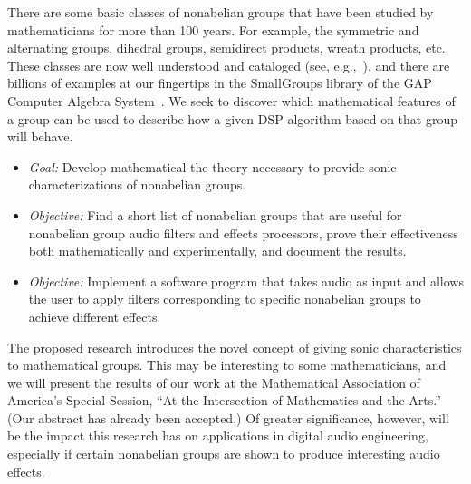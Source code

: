 \documentclass[10pt]{article}
\begin{document}
There are some basic classes of nonabelian groups that have been studied by
mathematicians for more than 100 years.  For example, the symmetric and 
alternating groups, dihedral groups, semidirect products, wreath products,
etc.  These classes are now well understood and cataloged 
(see, e.g.,~\cite{ATLAS:1986}), and there are billions of examples at our
fingertips in the SmallGroups library of the GAP Computer Algebra System~\cite{GAP4}.   
We seek to discover which mathematical features of a group can be used to
describe how a given DSP algorithm based on that group will behave. 

\begin{itemize}
\item {\it Goal:}
Develop mathematical the theory necessary to provide sonic characterizations of nonabelian groups.
\item
{\it Objective:} Find a short list of nonabelian groups that are useful for
nonabelian group audio filters and effects processors, prove their effectiveness
both mathematically and experimentally, and document the results.
\item
{\it Objective:} Implement a software program that takes audio as input and
allows the user to apply filters corresponding to specific nonabelian groups to
achieve different effects. 
\end{itemize}

 
\vskip5mm

The proposed research introduces the novel concept of giving sonic
characteristics to mathematical groups.  This may be interesting to 
some mathematicians, and we will present the results of our work at the Mathematical
Association of America's Special Session, ``At the Intersection of Mathematics
and the Arts.'' (Our  abstract has already been accepted.) 
Of greater significance, however, will be the impact this
research has on applications in digital audio engineering, especially if certain
nonabelian groups are shown to produce interesting audio effects.   
 
\end{document}
